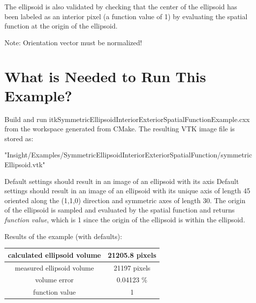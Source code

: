\documentclass{InsightHowto}
\begin{document}
The ellipsoid is also validated by checking that the center of the ellipsoid has been
labeled as an interior pixel (a function value of 1) by evaluating the spatial function at
the origin of the ellipsoid.

Note: Orientation vector must be normalized!

\section{What is Needed to Run This Example?}

Build and run itkSymmetricEllipsoidInteriorExteriorSpatialFunctionExample.cxx from the
workspace generated from CMake. The resulting VTK image file is stored as:

\begin{center}
"Insight/Examples/SymmetricEllipsoidInteriorExteriorSpatialFunction/symmetricEllipsoid.vtk"
\end{center}

Default settings should result in an image of an ellipsoid with its axis Default settings
should result in an image of an ellipsoid with its unique axis of length 45 oriented along
the (1,1,0) direction and symmetric axes of length 30. The origin of the ellipsoid is
sampled and evaluated by the spatial function and returns \emph{function value}, which is 1
since the origin of the ellipsoid is within the ellipsoid.

   \begin{center}
   Results of the example (with defaults):\\
   \begin{tabular}{|c|c|}  %
   \hline            %
   calculated ellipsoid volume & 21205.8 pixels \\
   \hline
   measured ellipsoid volume & 21197 pixels \\
   \hline
   volume error & 0.04123 \% \\
   \hline
   function value  &  1 \\
   \hline
   \end{tabular}
   \end{center}
\end{document}

